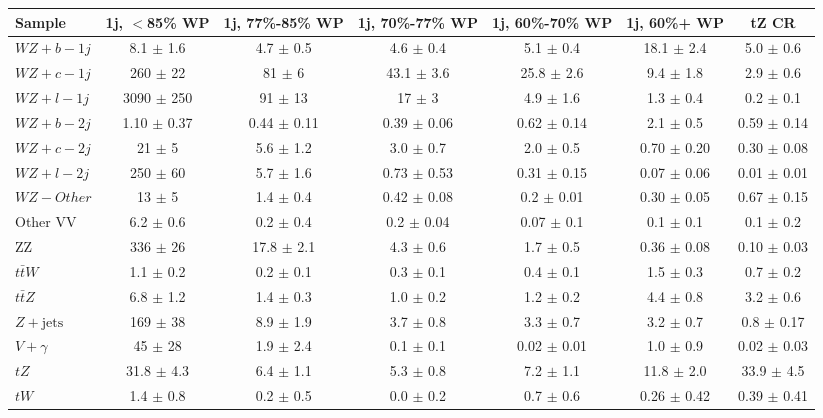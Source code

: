 \begin{tabular}{|l|c|c|c|c|c|c|}
\hline 
Sample & {1j, $<$85\% WP} & {1j, 77\%-85\% WP} & {1j, 70\%-77\% WP} & {1j, 60\%-70\% WP} & {1j, 60\%+ WP} & {tZ CR}\\
\hline 
  $WZ + b - 1j$   & 8.1 $\pm$ 1.6 & 4.7 $\pm$ 0.5 & 4.6 $\pm$ 0.4 & 5.1 $\pm$ 0.4 & 18.1 $\pm$ 2.4 & 5.0 $\pm$ 0.6 \\ 
  $WZ + c - 1j$   & 260 $\pm$ 22 & 81 $\pm$ 6 & 43.1 $\pm$ 3.6 & 25.8 $\pm$ 2.6 & 9.4 $\pm$ 1.8 & 2.9 $\pm$ 0.6 \\ 
  $WZ + l - 1j$   & 3090 $\pm$ 250 & 91 $\pm$ 13 & 17 $\pm$ 3 & 4.9 $\pm$ 1.6 & 1.3 $\pm$ 0.4 & 0.2 $\pm$ 0.1 \\ 
  $WZ + b - 2j$   & 1.10 $\pm$ 0.37 & 0.44 $\pm$ 0.11 & 0.39 $\pm$ 0.06 & 0.62 $\pm$ 0.14 & 2.1 $\pm$ 0.5 & 0.59 $\pm$ 0.14 \\
  $WZ + c - 2j$   & 21 $\pm$ 5 & 5.6 $\pm$ 1.2 & 3.0 $\pm$ 0.7 & 2.0 $\pm$ 0.5 & 0.70 $\pm$ 0.20 & 0.30 $\pm$ 0.08\\
  $WZ + l - 2j$   & 250 $\pm$ 60 & 5.7 $\pm$ 1.6 & 0.73 $\pm$ 0.53 & 0.31 $\pm$ 0.15 & 0.07 $\pm$ 0.06 & 0.01 $\pm$ 0.01 \\
  $WZ - Other$   & 13 $\pm$ 5 & 1.4 $\pm$ 0.4 & 0.42 $\pm$ 0.08 & 0.2 $\pm$ 0.01 & 0.30 $\pm$ 0.05 & 0.67 $\pm$ 0.15 \\
  Other VV   & 6.2 $\pm$ 0.6 & 0.2 $\pm$ 0.4 & 0.2 $\pm$ 0.04 & 0.07 $\pm$ 0.1 & 0.1 $\pm$ 0.1 & 0.1 $\pm$ 0.2 \\ 
  ZZ   & 336 $\pm$ 26 & 17.8 $\pm$ 2.1 & 4.3 $\pm$ 0.6 & 1.7 $\pm$ 0.5 & 0.36 $\pm$ 0.08 & 0.10 $\pm$ 0.03 \\ 
  $t\bar{t}W$   & 1.1 $\pm$ 0.2 & 0.2 $\pm$ 0.1 & 0.3 $\pm$ 0.1 & 0.4 $\pm$ 0.1 & 1.5 $\pm$ 0.3 & 0.7 $\pm$ 0.2 \\ 
  $t\bar{t}Z$   & 6.8 $\pm$ 1.2 & 1.4 $\pm$ 0.3 & 1.0 $\pm$ 0.2 & 1.2 $\pm$ 0.2 & 4.4 $\pm$ 0.8 & 3.2 $\pm$ 0.6 \\ 
  $Z+\text{jets}$   & 169 $\pm$ 38 & 8.9 $\pm$ 1.9 & 3.7 $\pm$ 0.8 & 3.3 $\pm$ 0.7 & 3.2 $\pm$ 0.7 & 0.8 $\pm$ 0.17 \\ 
  $V+\gamma$   & 45 $\pm$ 28 & 1.9 $\pm$ 2.4 & 0.1 $\pm$ 0.1 & 0.02 $\pm$ 0.01 & 1.0 $\pm$ 0.9 & 0.02 $\pm$ 0.03 \\ 
  $tZ$   & 31.8 $\pm$ 4.3 & 6.4 $\pm$ 1.1 & 5.3 $\pm$ 0.8 & 7.2 $\pm$ 1.1 & 11.8 $\pm$ 2.0 & 33.9 $\pm$ 4.5 \\ 
  $tW$   & 1.4 $\pm$ 0.8 & 0.2 $\pm$ 0.5 & 0.0 $\pm$ 0.2 & 0.7 $\pm$ 0.6 & 0.26 $\pm$ 0.42 & 0.39 $\pm$ 0.41 \\ 

\end{tabular}
